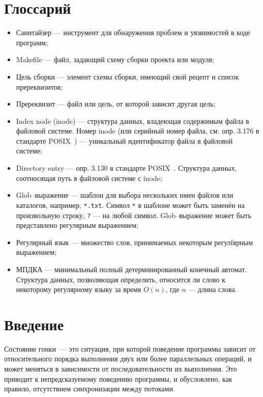 \section{Глоссарий}
\label{sec:Glossary} 

\begin{itemize}
    \item Санитайзер --- инструмент для обнаружения проблем и уязвимостей в коде программ;
    \item Makefile --- файл, задающий схему сборки проекта или модуля;
    \item Цель сборки --- элемент схемы сборки, имеющий свой рецепт и список пререквизитов;
    \item Пререквизит --- файл или цель, от которой зависит другая цель;
    \item Index node (inode) --- структура данных, владеющая содержимым файла в файловой системе. Номер inode (или серийный номер файла, см. опр. 3.176 в стандарте POSIX~\cite{8277153}) --- уникальный идентификатор файла в файловой системе;
    \item Directory entry --- опр. 3.130 в стандарте POSIX~\cite{8277153}. Структура данных, соотносящая путь в файловой системе с inode;
    \item Glob--выражение --- шаблон для выбора нескольких имен файлов или каталогов, например, \texttt{*.txt}. Символ \texttt{*} в шаблоне может быть заменён на произвольную строку, \texttt{?} --- на любой символ. Glob--выражение может быть представлено регулярным выражением;
    \item Регулярный язык --- множество слов, принимаемых некоторым регулfярным выражением;
    \item МПДКА --- минимальный полный детерминированный конечный автомат. Структура данных, позволяющая определить, относится ли слово к некоторому регулярному языку за время $O(n)$, где $n$ --- длина слова.
\end{itemize}

\section{Введение}
\label{sec:Chapter0} 


Состояние гонки~--- это ситуация, при которой поведение программы зависит от относительного порядка выполнения двух или более параллельных операций, и может меняться в зависимости от последовательности их выполнения. Это приводит к непредсказуемому поведению программы, и обусловлено, как правило, отсутствием синхронизации между потоками.

